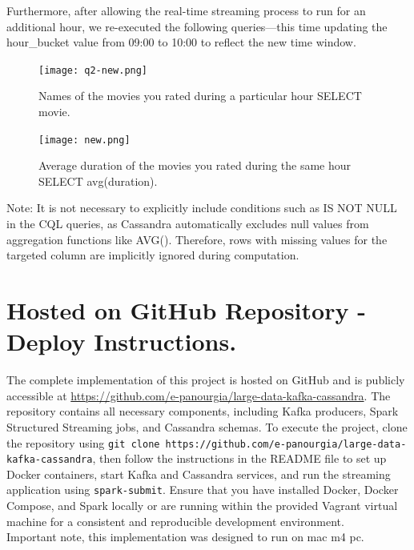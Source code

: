 \documentclass[a4paper,11pt]{article}
\theoremstyle{mytheor}
\begin{document}
Furthermore, after allowing the real-time streaming process to run for an additional hour, we re-executed the following queries—this time updating the hour\_bucket value from 09:00 to 10:00 to reflect the new time window.\\

\begin{figure}[H]
    \centering
    \texttt{[image: q2-new.png]} %
    \caption{ Names of the movies you rated during a particular hour
SELECT movie.}
    \label{fig:cassandra-sample}
\end{figure}


\begin{figure}[H]
    \centering
    \texttt{[image: new.png]} %
    \caption{Average duration of the movies you rated during the same hour
SELECT avg(duration).}
    \label{fig:cassandra-sample}
\end{figure}

Note: It is not necessary to explicitly include conditions such as IS NOT NULL in the CQL queries, as Cassandra automatically excludes null values from aggregation functions like AVG(). Therefore, rows with missing values for the targeted column are implicitly ignored during computation.\\

\section*{Hosted on GitHub Repository - Deploy Instructions.}
The complete implementation of this project is hosted on GitHub and is publicly accessible at \url{https://github.com/e-panourgia/large-data-kafka-cassandra}. The repository contains all necessary components, including Kafka producers, Spark Structured Streaming jobs, and Cassandra schemas. To execute the project, clone the repository using \texttt{git clone https://github.com/e-panourgia/large-data-kafka-cassandra}, then follow the instructions in the README file to set up Docker containers, start Kafka and Cassandra services, and run the streaming application using \texttt{spark-submit}. Ensure that you have installed Docker, Docker Compose, and Spark locally or are running within the provided Vagrant virtual machine for a consistent and reproducible development environment. \\

Important note, this implementation was designed to run on mac m4 pc.
\end{document}
